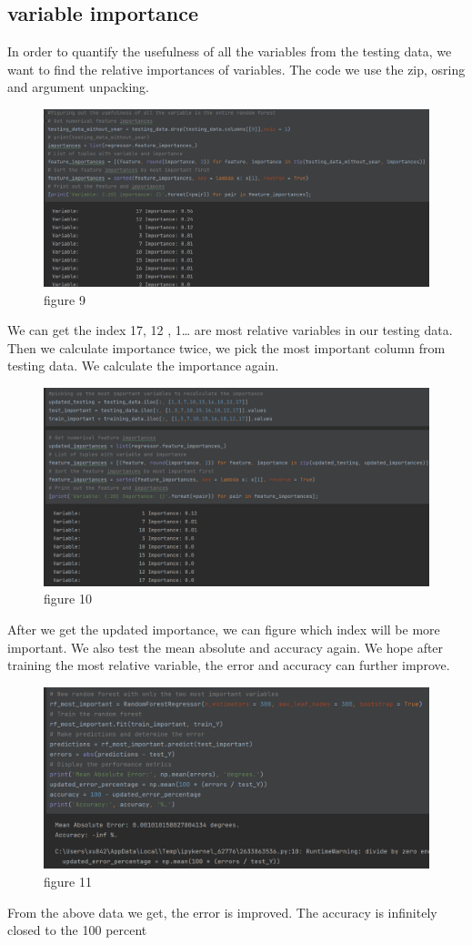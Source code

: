 \documentclass{article}
\begin{document}
\subsection{variable importance}
In order to quantify the usefulness of all the variables from the testing data, we want to find the relative importances of variables. The code we use the zip, osring and argument unpacking. 
\begin{figure}[H]
    \centering
    \includegraphics[width = 0.9\linewidth]{9.png}
    \caption{figure 9}
\end{figure}
We can get the index 17, 12 , 1… are most relative variables in our testing data. Then we calculate importance twice, we pick the most important column from testing data. We calculate the importance again. 
\begin{figure}[H]
    \centering
    \includegraphics[width = 0.9\linewidth]{10.png}
    \caption{figure 10}
\end{figure}
After we get the updated importance, we can figure which index will be more important. 
We also test the mean absolute and accuracy again. We hope after training  the most relative variable, the error and accuracy can further improve.
\begin{figure}[H]
    \centering
    \includegraphics[width = 0.9\linewidth]{11.png}
    \caption{figure 11}
\end{figure}
From the above data we get, the error is improved. The accuracy is infinitely closed to the 100 percent
\end{document}
